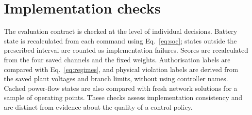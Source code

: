 \documentclass[11pt,a4paper]{article}
\begin{document}
\appendix
\section{Implementation checks}\label{sec:checks}
The evaluation contract is checked at the level of individual decisions. Battery state is recalculated from each command using Eq.~\eqref{eq:soc}; states outside the prescribed interval are counted as implementation failures. Scores are recalculated from the four saved channels and the fixed weights. Authorisation labels are compared with Eq.~\eqref{eq:regimes}, and physical violation labels are derived from the saved plant voltages and branch limits, without using controller names. Cached power-flow states are also compared with fresh network solutions for a sample of operating points. These checks assess implementation consistency and are distinct from evidence about the quality of a control policy.
\end{document}
